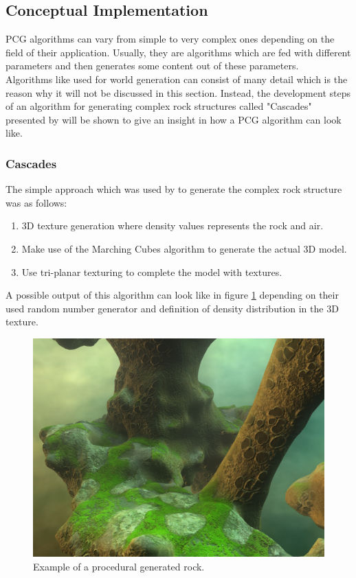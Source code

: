 \documentclass[MGS,Master,english]{twbook}%
\begin{document}
\subsection{Conceptual Implementation}
PCG algorithms can vary from simple to very complex ones depending on the field of their application. Usually, they are algorithms which are fed with different parameters and then generates some content out of these parameters.\\
Algorithms like used for world generation can consist of many detail which is the reason why it will not be discussed in this section. Instead, the development steps of an algorithm for generating complex rock structures called "Cascades" presented by \cite{nvidia::cascades} will be shown to give an insight in how a PCG algorithm can look like.

\subsubsection{Cascades}
The simple approach which was used by \cite{nvidia::cascades} to generate the complex rock structure was as follows:
\begin{enumerate}
	\item 3D texture generation where density values represents the rock and air.
	\item Make use of the Marching Cubes algorithm to generate the actual 3D model.
	\item Use tri-planar texturing to complete the model with textures.
\end{enumerate}
A possible output of this algorithm can look like in figure \ref{cascadesFigure} depending on their used random number generator and definition of density distribution in the 3D texture. 
\begin{figure}[!htbp]
	\centering
	\includegraphics[width=0.5\linewidth]{PICs/cascades}
	\caption{Example of a procedural generated rock. \protect\cite{nvidia::cascades}}\label{cascadesFigure}
\end{figure}
\end{document}
